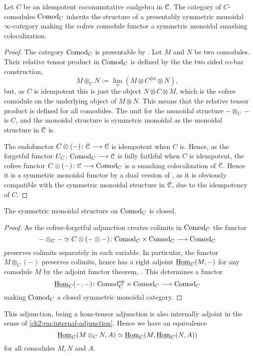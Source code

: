 \begin{lemma}
    \label{ch2:lm:idempotent-then-comod-monoidal}
    Let $C$ be an idempotent cocommutative coalgebra in $\EuScript{C}$. The category of $C$-comodules $\mathrm{Comod}_C$ inherits the structure of a presentably symmetric monoidal $\infty$-category making the cofree comodule functor a symmetric monoidal smashing colocalization.
\end{lemma}
\begin{proof}
    The category $\mathrm{Comod}_C$ is presentable by \cite[2.1.11]{peroux_2020}. Let $M$ and $N$ be two comodules. Their relative tensor product in $\mathrm{Comod}_C$ is defined by the the two sided co-bar construction,
    \[M\otimes_C N := \lim_n (M \otimes C^{\otimes n} \otimes N),\]
    but, as $C$ is idempotent this is just the object $N\otimes C\otimes M$, which is the cofree comodule on the underlying object of $M\otimes N$. This means that the relative tensor product is defined for all comodules. The unit for the monoidal structure $-\otimes_C-$ is $C$, and the monoidal structure is symmetric monoidal as the monoidal structure in $\EuScript{C}$ is. 

    The endofunctor $C\otimes (-)\colon \EuScript{C}\longrightarrow \EuScript{C}$ is idempotent when $C$ is. Hence, as the forgetful functor $U_C\colon \mathrm{Comod}_C\longrightarrow \EuScript{C}$ is fully faithful when $C$ is idempotent, the cofree functor $C\otimes (-)\colon \EuScript{C}\longrightarrow \mathrm{Comod}_C$ is a smashing colocalization of $\EuScript{C}$. Hence it is a symmetric monoidal functor by a dual version of \cite[2.2.1.9]{Lurie_HA}, as it is obviously compatible with the symmetric monoidal structure in $\EuScript{C}$, due to the idempotency of $C$. 
\end{proof}

\begin{lemma}
    The symmetric monoidal structure on $\mathrm{Comod}_C$ is closed. 
\end{lemma}
\begin{proof}
    As the cofree-forgetful adjunction creates colimits in $\mathrm{Comod}_C$ the functor 
    \[-\otimes_C- \simeq C\otimes (-\otimes -)\colon \mathrm{Comod}_C \times \mathrm{Comod}_C \longrightarrow \mathrm{Comod}_C\] 
    preserves colimits separately in each variable. In particular, the functor $M\otimes_C (-)$ preserves colimits, hence has a right adjoint $\operatorname{\underline{Hom}}_C(M,-)$ for any comodule $M$ by the adjoint functor theorem, \cite[5.5.2.9]{lurie_09}. This determines a functor 
    \[\operatorname{\underline{Hom}}_C(-,-)\colon \mathrm{Comod}_C^{\mathrm{op}}\times \mathrm{Comod}_C\longrightarrow \mathrm{Comod}_C\]
    making $\mathrm{Comod}_C$ a closed symmetric monoidal category.  
\end{proof}

\begin{remark}
    This adjunction, being a hom-tensor adjunction is also internally adjoint in the sense of \cref{ch2:rm:internal-adjunction}. Hence we have an equivalence 
    \[\operatorname{\underline{Hom}}_C(M\otimes_C N, A) \simeq \operatorname{\underline{Hom}}_C(M, \operatorname{\underline{Hom}}_C(N, A))\]
    for all comodules $M, N$ and $A$. 
\end{remark}

